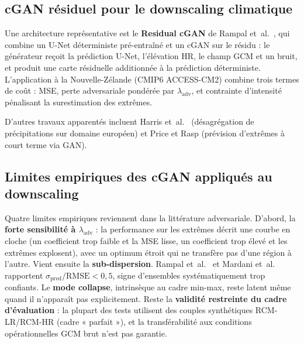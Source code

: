 \subsection{cGAN résiduel pour le downscaling climatique}
\label{ssec:soa-rampal}

Une architecture représentative est le \textbf{Residual cGAN} de Rampal et~al.~\cite{rampal_cgan_2024}, qui combine un U-Net déterministe pré-entraîné et un cGAN sur le résidu : le générateur reçoit la prédiction U-Net, l'élévation HR, le champ GCM et un bruit, et produit une carte résiduelle additionnée à la prédiction déterministe. L'application à la Nouvelle-Zélande (CMIP6 ACCESS-CM2) combine trois termes de coût : MSE, perte adversariale pondérée par $\lambda_{\mathrm{adv}}$, et contrainte d'intensité pénalisant la surestimation des extrêmes.

D'autres travaux apparentés incluent Harris et~al.~\cite{harris_2022} (désagrégation de précipitations sur domaine européen) et Price et Rasp (prévision d'extrêmes à court terme via GAN).

\subsection{Limites empiriques des cGAN appliqués au downscaling}
\label{ssec:soa-cgan-limites}

Quatre limites empiriques reviennent dans la littérature adversariale. D'abord, la \textbf{forte sensibilité à $\lambda_{\mathrm{adv}}$} : la performance sur les extrêmes décrit une courbe en cloche (un coefficient trop faible et la MSE lisse, un coefficient trop élevé et les extrêmes explosent), avec un optimum étroit qui ne transfère pas d'une région à l'autre. Vient ensuite la \textbf{sub-dispersion}. Rampal et~al.~\cite{rampal_cgan_2024} et Mardani et~al.~\cite{mardani_corrdiff_2023} rapportent $\sigma_{\mathrm{pred}}/\mathrm{RMSE} < 0{,}5$, signe d'ensembles systématiquement trop confiants. Le \textbf{mode collapse}, intrinsèque au cadre min-max, reste latent même quand il n'apparaît pas explicitement. Reste la \textbf{validité restreinte du cadre d'évaluation} : la plupart des tests utilisent des couples synthétiques RCM-LR/RCM-HR (cadre « parfait »), et la transférabilité aux conditions opérationnelles GCM brut n'est pas garantie.

\label{sec:soa-vrai}

